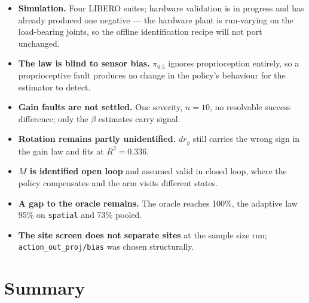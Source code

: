 \documentclass[11pt,a4paper]{article}
\newcommand{\code}[1]{\texttt{\small #1}}
\begin{document}
\begin{itemize}[leftmargin=1.4em,itemsep=3pt]
  \item \textbf{Simulation.} Four LIBERO suites; hardware validation is in
        progress and has already produced one negative --- the hardware plant is
        run-varying on the load-bearing joints, so the offline identification
        recipe will not port unchanged.
  \item \textbf{The law is blind to sensor bias.} $\pi_{0.5}$ ignores
        proprioception entirely, so a proprioceptive fault produces no change in
        the policy's behaviour for the estimator to detect.
  \item \textbf{Gain faults are not settled.} One severity, $n{=}10$, no
        resolvable success difference; only the $\beta$ estimates carry signal.
  \item \textbf{Rotation remains partly unidentified.} $d r_y$ still carries the
        wrong sign in the gain law and fits at $R^2 = 0.336$.
  \item \textbf{$M$ is identified open loop} and assumed valid in closed loop,
        where the policy compensates and the arm visits different states.
  \item \textbf{A gap to the oracle remains.} The oracle reaches 100\%, the
        adaptive law 95\% on \code{spatial} and 73\% pooled.
  \item \textbf{The site screen does not separate sites} at the sample size run;
        \code{action\_out\_proj/bias} was chosen structurally.
\end{itemize}

\section{Summary}
\end{document}

